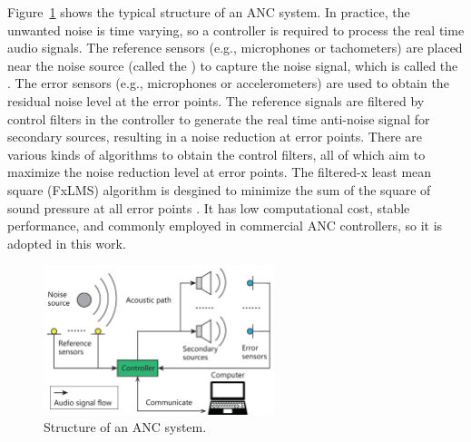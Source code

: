 Figure~\ref{fig:anc_structure} shows the typical structure of an ANC system.
    In practice, the unwanted noise is time varying, so a controller is required to process the real time audio signals.
    The reference sensors (e.g., microphones or tachometers) are placed near the noise source (called the ) to capture the noise signal, which is called the .
    The error sensors (e.g., microphones or accelerometers) are used to obtain the residual noise level at the error points.
    The reference signals are filtered by control filters in the controller to generate the real time anti-noise signal for secondary sources, resulting in a noise reduction at error points.
    There are various kinds of algorithms to obtain the control filters,
    all of which aim to maximize the noise reduction level at error points.
    The filtered-x least mean square (FxLMS) algorithm is desgined to minimize the sum of the square of sound pressure at all error points \cite{Elliott2000SignalProcessingActive}. 
    It has low computational cost, stable performance, and commonly employed in commercial ANC controllers, so it is adopted in this work.

\begin{figure}[!htb]
    \centering
    \includegraphics[width = 0.6\textwidth]{fig/ANC_structure/ANC_structure_211117A.png}
    \caption{Structure of an ANC system.}
    \label{fig:anc_structure}
\end{figure}


